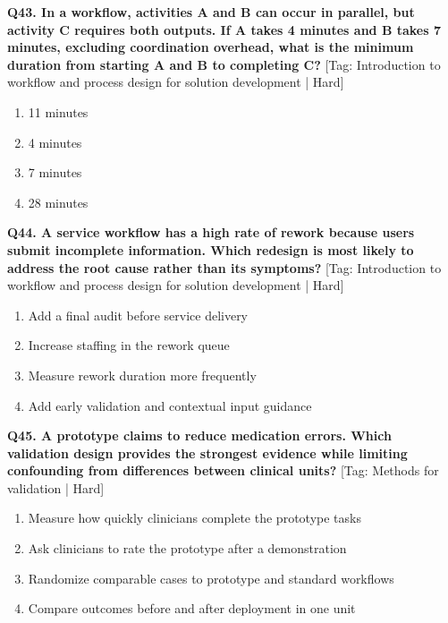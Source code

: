 \noindent\textbf{Q43. In a workflow, activities A and B can occur in parallel, but activity C requires both outputs. If A takes 4 minutes and B takes 7 minutes, excluding coordination overhead, what is the minimum duration from starting A and B to completing C?} \hfill [Tag: Introduction to workflow and process design for solution development | Hard]
\begin{enumerate}[label=(\alph*),topsep=2pt,itemsep=1pt,partopsep=0pt,parsep=0pt]
    \item {11 minutes}
    \item {4 minutes}
    \item {7 minutes}
    \item {28 minutes}
\end{enumerate}
\vspace{2mm}

\noindent\textbf{Q44. A service workflow has a high rate of rework because users submit incomplete information. Which redesign is most likely to address the root cause rather than its symptoms?} \hfill [Tag: Introduction to workflow and process design for solution development | Hard]
\begin{enumerate}[label=(\alph*),topsep=2pt,itemsep=1pt,partopsep=0pt,parsep=0pt]
    \item {Add a final audit before service delivery}
    \item {Increase staffing in the rework queue}
    \item {Measure rework duration more frequently}
    \item {Add early validation and contextual input guidance}
\end{enumerate}
\vspace{2mm}

\noindent\textbf{Q45. A prototype claims to reduce medication errors. Which validation design provides the strongest evidence while limiting confounding from differences between clinical units?} \hfill [Tag: Methods for validation | Hard]
\begin{enumerate}[label=(\alph*),topsep=2pt,itemsep=1pt,partopsep=0pt,parsep=0pt]
    \item {Measure how quickly clinicians complete the prototype tasks}
    \item {Ask clinicians to rate the prototype after a demonstration}
    \item {Randomize comparable cases to prototype and standard workflows}
    \item {Compare outcomes before and after deployment in one unit}
\end{enumerate}
\vspace{2mm}


